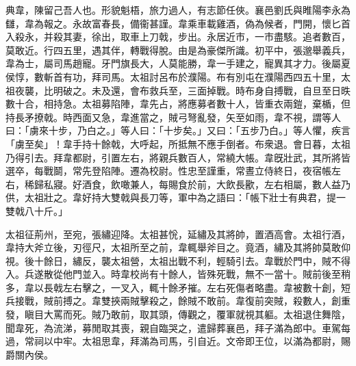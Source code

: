 
\begin{pinyinscope}
典韋，陳留己吾人也。形貌魁梧，旅力過人，有志節任俠。襄邑劉氏與睢陽李永為讎，韋為報之。永故富春長，備衞甚謹。韋乘車載雞酒，偽為候者，門開，懷匕首入殺永，并殺其妻，徐出，取車上刀戟，步出。永居近巿，一巿盡駭。追者數百，莫敢近。行四五里，遇其伴，轉戰得脫。由是為豪傑所識。初平中，張邈舉義兵，韋為士，屬司馬趙寵。牙門旗長大，人莫能勝，韋一手建之，寵異其才力。後屬夏侯惇，數斬首有功，拜司馬。太祖討呂布於濮陽。布有別屯在濮陽西四五十里，太祖夜襲，比明破之。未及還，會布救兵至，三面掉戰。時布身自搏戰，自旦至日昳數十合，相持急。太祖募陷陣，韋先占，將應募者數十人，皆重衣兩鎧，棄楯，但持長矛撩戟。時西面又急，韋進當之，賊弓弩亂發，矢至如雨，韋不視，謂等人曰：「虜來十步，乃白之。」等人曰：「十步矣。」又曰：「五步乃白。」等人懼，疾言「虜至矣」！韋手持十餘戟，大呼起，所抵無不應手倒者。布衆退。會日暮，太祖乃得引去。拜韋都尉，引置左右，將親兵數百人，常繞大帳。韋旣壯武，其所將皆選卒，每戰鬬，常先登陷陣。遷為校尉。性忠至謹重，常晝立侍終日，夜宿帳左右，稀歸私寢。好酒食，飲噉兼人，每賜食於前，大飲長歠，左右相屬，數人益乃供，太祖壯之。韋好持大雙戟與長刀等，軍中為之語曰：「帳下壯士有典君，提一雙戟八十斤。」

太祖征荊州，至宛，張繡迎降。太祖甚恱，延繡及其將帥，置酒高會。太祖行酒，韋持大斧立後，刃徑尺，太祖所至之前，韋輒舉斧目之。竟酒，繡及其將帥莫敢仰視。後十餘日，繡反，襲太祖營，太祖出戰不利，輕騎引去。韋戰於門中，賊不得入。兵遂散從他門並入。時韋校尚有十餘人，皆殊死戰，無不一當十。賊前後至稍多，韋以長戟左右擊之，一叉入，輒十餘矛摧。左右死傷者略盡。韋被數十創，短兵接戰，賊前搏之。韋雙挾兩賊擊殺之，餘賊不敢前。韋復前突賊，殺數人，創重發，瞋目大罵而死。賊乃敢前，取其頭，傳觀之，覆軍就視其軀。太祖退住舞陰，聞韋死，為流涕，募閒取其喪，親自臨哭之，遣歸葬襄邑，拜子滿為郎中。車駕每過，常祠以中牢。太祖思韋，拜滿為司馬，引自近。文帝即王位，以滿為都尉，賜爵關內侯。


\end{pinyinscope}